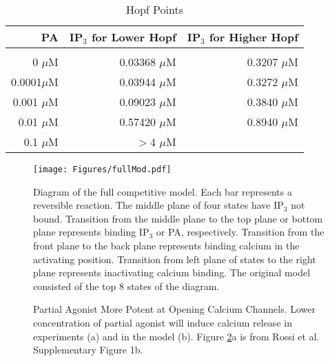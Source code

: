 \documentclass[preprint,12pt]{elsarticle}
\begin{document}
\begin{table}[ht]
\caption{Hopf Points} %
\centering %
\begin{tabular}{r r r} %
\hline\hline %
PA & IP$_3$ for Lower Hopf & IP$_3$ for Higher Hopf \\ [0.5ex] %
\hline %
\\
0 $\mu$M &  0.03368 $\mu$M & 0.3207 $\mu$M \\ %
0.0001$\mu$M  &  0.03944 $\mu$M & 0.3272 $\mu$M \\ %
0.001 $\mu$M & 0.09023 $\mu$M & 0.3840 $\mu$M \\
0.01 $\mu$M & 0.57420 $\mu$M & 0.8940 $\mu$M \\
0.1 $\mu$M & $>$4 $\mu$M &  \\ [1ex] %
\hline %
\end{tabular}
\label{tab:hopf} %
\end{table}

\clearpage

\begin{figure}[tbh]
\centering
\texttt{[image: Figures/fullMod.pdf]}
\caption{Diagram of the full competitive model. Each bar represents a reversible reaction. The middle plane of four states have IP$_3$ not bound. Transition from the middle plane to the top plane or bottom plane represents binding IP$_3$ or PA, respectively. Transition from the front plane to the back plane represents binding calcium in the activating position. Transition from left plane of states to the right plane represents inactivating calcium binding. The original model consisted of the top 8 states of the diagram.}
\label{fig:fullMod}
\end{figure}

\begin{figure}[tbh]
\centering
{}
\caption{Partial Agonist More Potent at Opening Calcium Channels. Lower concentration of partial agonist will induce calcium release in experiments (a) and in the model (b). Figure \ref{fig:Rossi2a}a is from Rossi et al. Supplementary Figure 1b.}
\label{fig:Rossi2a}
\end{figure}
\end{document}
